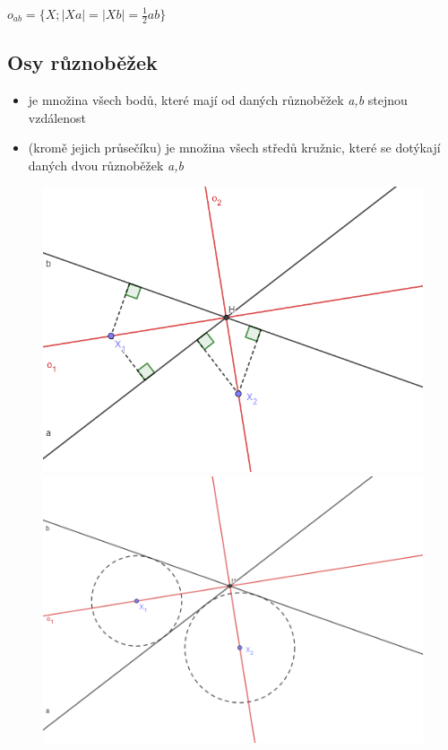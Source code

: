 \documentclass[12pt, a4paper]{article}
\begin{document}
$o_{ab}=\{X; |Xa|=|Xb|=\frac{1}{2}ab\}$\\

\subsection*{Osy různoběžek}
\begin{itemize}
\item je množina všech bodů, které mají od daných různoběžek \textit{a,b} stejnou vzdálenost
\item (kromě jejich průsečíku) je množina všech středů kružnic, které se dotýkají daných dvou různoběžek \textit{a,b}
\end{itemize}

\begin{figure}[H]
\centering
\begin{minipage}{0.5\textwidth}
\includegraphics[scale=0.47]{osaruznobezek1}
\end{minipage}%
\vspace{3cm}
\begin{minipage}{0.5\textwidth}
\includegraphics[scale=0.4]{osaruznobezek2}
\end{minipage}
\end{figure}
\end{document}
